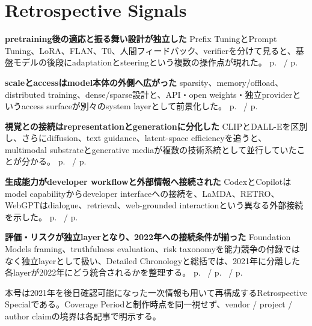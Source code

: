 \section*{Retrospective Signals}
\smallskip
\noindent \textbf{pretraining後の適応と振る舞い設計が独立した} Prefix TuningとPrompt Tuning、LoRA、FLAN、T0、人間フィードバック、verifierを分けて見ると、基盤モデルの後段にadaptationとsteeringという複数の操作点が現れた。 \hfill{\footnotesize p.~\pageref{pkg:adaptation-efficient-tuning} / p.~\pageref{pkg:instruction-human-feedback}}
\par
\smallskip
\noindent \textbf{scaleとaccessはmodel本体の外側へ広がった} sparsity、memory/offload、distributed training、dense/sparse設計と、API・open weights・独立providerというaccess surfaceが別々のsystem layerとして前景化した。 \hfill{\footnotesize p.~\pageref{pkg:scale-sparse-systems} / p.~\pageref{pkg:access-distribution}}
\par
\smallskip
\noindent \textbf{視覚との接続はrepresentationとgenerationに分化した} CLIPとDALL-Eを区別し、さらにdiffusion、text guidance、latent-space efficiencyを追うと、multimodal substrateとgenerative mediaが複数の技術系統として並行していたことが分かる。 \hfill{\footnotesize p.~\pageref{pkg:multimodal-substrate} / p.~\pageref{pkg:diffusion-media}}
\par
\smallskip
\noindent \textbf{生成能力がdeveloper workflowと外部情報へ接続された} CodexとCopilotはmodel capabilityからdeveloper interfaceへの接続を、LaMDA、RETRO、WebGPTはdialogue、retrieval、web-grounded interactionという異なる外部接続を示した。 \hfill{\footnotesize p.~\pageref{pkg:code-developer-interface} / p.~\pageref{pkg:dialogue-retrieval-grounding}}
\par
\smallskip
\noindent \textbf{評価・リスクが独立layerとなり、2022年への接続条件が揃った} Foundation Models framing、truthfulness evaluation、risk taxonomyを能力競争の付録ではなく独立layerとして扱い、Detailed Chronologyと総括では、2021年に分離した各layerが2022年にどう統合されるかを整理する。 \hfill{\footnotesize p.~\pageref{pkg:evaluation-risk-foundation} / p.~\pageref{pkg:annual-chronology} / p.~\pageref{pkg:synthesis-transition-2022}}
\par
\medskip
\begin{claimboundary}
本号は2021年を後日確認可能になった一次情報も用いて再構成するRetrospective Specialである。Coverage Periodと制作時点を同一視せず、vendor / project / author claimの境界は各記事で明示する。
\end{claimboundary}
\medskip
\tableofcontents
